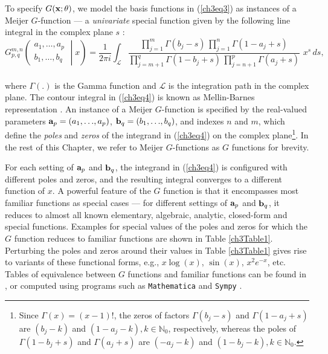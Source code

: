\documentclass [PhD] {uclathes}
\newcommand{\MeijerG}[7]{G^{#1,#2}_{#3,#4} \left( \begin{smallmatrix} #5 \\ #6 \end{smallmatrix} \middle\vert #7 \right) }
\begin{document}
To specify $G({\bf x};\theta)$, we model the basis functions in (\ref{ch3eq3}) as instances of a Meijer $G$-function --- a {\it univariate} special function given by the following line integral in the complex plane $s$ \cite{meijer1946gfunc, meijer1936uber}:\\ 
\begin{equation}
\MeijerG{m}{n}{p}{q}{a_1,\ldots,a_p}{b_1,\ldots,b_q}{x} = \frac{1}{2\pi i} \int_\mathcal{L} \frac{\prod^m_{j=1} \Gamma(b_j - s)\,\prod^n_{j=1} \Gamma(1 - a_j + s)}{\prod^q_{j=m+1} \Gamma(1 - b_j + s)\,\prod^p_{j=n+1} \Gamma(a_j + s)} \,\, x^s \, ds,
\label{ch3eq4}
\end{equation}\\
where $\Gamma(.)$ is the Gamma function and $\mathcal{L}$ is the integration path in the complex plane. The contour integral in (\ref{ch3eq4}) is known as  Mellin-Barnes representation \cite{beals2013meijer}. An instance of a Meijer $G$-function is specified by the real-valued parameters ${\bf a}_p = (a_1,.\,.\,.,a_p)$, ${\bf b}_q = (b_1,.\,.\,.,b_q)$, and indexes $n$ and $m$, which define the {\it poles} and {\it zeros} of the integrand in (\ref{ch3eq4}) on the complex plane\footnote{Since $\Gamma(x) = (x-1)!$, the zeros of factors $\Gamma(b_j - s)$ and $ \Gamma(1 - a_j + s)$ are $(b_j-k)$ and $(1-a_j-k), k \in \mathbb{N}_0$, respectively, whereas the poles of $\Gamma(1 - b_j + s)$ and $ \Gamma(a_j + s)$ are $(-a_j-k)$ and $(1-b_j-k), k \in \mathbb{N}_0$.}. In the rest of this Chapter, we refer to Meijer $G$-functions as $G$ functions for brevity. 

For each setting of ${\bf a}_p$ and ${\bf b}_q$, the integrand in (\ref{ch3eq4}) is configured with different poles and zeros, and the resulting integral converges to a different function of $x$. A powerful feature of the $G$ function is that it encompasses most familiar functions as special cases \cite{beals2013meijer} --- for different settings of ${\bf a}_p$ and ${\bf b}_q$, it reduces to almost all known elementary, algebraic, analytic, closed-form and special functions. Examples for special values of the poles and zeros for which the $G$ function reduces to familiar functions are shown in Table \ref{ch3Table1}. Perturbing the poles and zeros around their values in Table \ref{ch3Table1} gives rise to variants of these functional forms, e.g., $x \log(x)$, $\sin(x)$, $x^2 e^{-x}$, etc. Tables of equivalence between $G$ functions and familiar functions can be found in \cite{TablesIntegrals2014}, or computed using programs such as {\footnotesize \texttt{Mathematica}} \cite{abell2017mathematica} and {\footnotesize \texttt{Sympy}} \cite{10.7717/peerj-cs.103}. 
\end{document}
